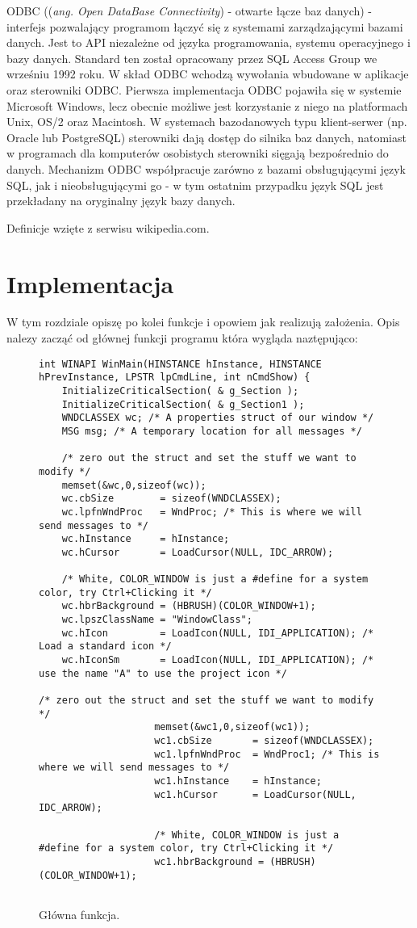 \documentclass[a4paper,twoside,12pt]{mgr}
\newcommand{\eng}[1]{(\emph{#1})}
\begin{document}
ODBC (\eng{ang. Open DataBase Connectivity} - otwarte łącze baz danych) - interfejs pozwalający programom łączyć się z systemami zarządzającymi bazami danych. Jest to API niezależne od języka programowania, systemu operacyjnego i bazy danych. Standard ten został opracowany przez SQL Access Group we wrześniu 1992 roku. W skład ODBC wchodzą wywołania wbudowane w aplikacje oraz sterowniki ODBC.
Pierwsza implementacja ODBC pojawiła się w systemie Microsoft Windows, lecz obecnie możliwe jest korzystanie z niego na platformach Unix, OS/2 oraz Macintosh.
W systemach bazodanowych typu klient-serwer (np. Oracle lub PostgreSQL) sterowniki dają dostęp do silnika baz danych, natomiast w programach dla komputerów osobistych sterowniki sięgają bezpośrednio do danych. Mechanizm ODBC współpracuje zarówno z bazami obsługującymi język SQL, jak i nieobsługującymi go - w tym ostatnim przypadku język SQL jest przekładany na oryginalny język bazy danych.

Definicje wzięte z serwisu wikipedia.com.
\chapter{Implementacja}
W tym rozdziale opiszę po kolei funkcje i opowiem jak realizują założenia. Opis nalezy zacząć od głównej funkcji programu która wygląda naztępująco:
		
\begin{figure}[H]
\centering
\begin{lstlisting}[frame=single]		
int WINAPI WinMain(HINSTANCE hInstance, HINSTANCE hPrevInstance, LPSTR lpCmdLine, int nCmdShow) {
	InitializeCriticalSection( & g_Section );
	InitializeCriticalSection( & g_Section1 );
	WNDCLASSEX wc; /* A properties struct of our window */
	MSG msg; /* A temporary location for all messages */

	/* zero out the struct and set the stuff we want to modify */
	memset(&wc,0,sizeof(wc));
	wc.cbSize		 = sizeof(WNDCLASSEX);
	wc.lpfnWndProc	 = WndProc; /* This is where we will send messages to */
	wc.hInstance	 = hInstance;
	wc.hCursor		 = LoadCursor(NULL, IDC_ARROW);
	
	/* White, COLOR_WINDOW is just a #define for a system color, try Ctrl+Clicking it */
	wc.hbrBackground = (HBRUSH)(COLOR_WINDOW+1);
	wc.lpszClassName = "WindowClass";
	wc.hIcon		 = LoadIcon(NULL, IDI_APPLICATION); /* Load a standard icon */
	wc.hIconSm		 = LoadIcon(NULL, IDI_APPLICATION); /* use the name "A" to use the project icon */
	
/* zero out the struct and set the stuff we want to modify */
					memset(&wc1,0,sizeof(wc1));
					wc1.cbSize		 = sizeof(WNDCLASSEX);
					wc1.lpfnWndProc	 = WndProc1; /* This is where we will send messages to */
					wc1.hInstance	 = hInstance;
					wc1.hCursor		 = LoadCursor(NULL, IDC_ARROW);
	
					/* White, COLOR_WINDOW is just a #define for a system color, try Ctrl+Clicking it */
					wc1.hbrBackground = (HBRUSH)(COLOR_WINDOW+1);
					
\end{lstlisting}
\caption{Główna funkcja.}%
\label{rys:etykieta}
\end{figure}	
\end{document}

